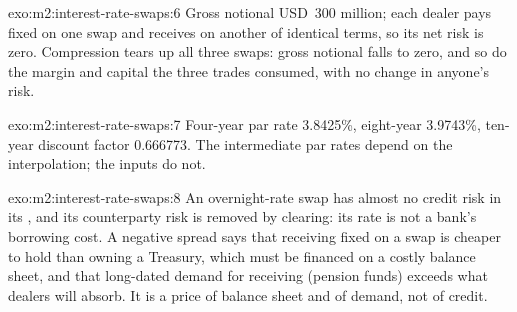 \begin{solution}{exo:m2:interest-rate-swaps:6}
Gross notional USD~300 million; each dealer pays fixed on one swap and receives
on another of identical terms, so its net risk is zero. Compression tears up
all three swaps: gross notional falls to zero, and so do the margin and capital
the three trades consumed, with no change in anyone's risk.
\end{solution}

\begin{solution}{exo:m2:interest-rate-swaps:7}
Four-year par rate 3.8425\%, eight-year 3.9743\%, ten-year discount factor
0.666773. The intermediate par rates depend on the interpolation; the inputs do
not.
\end{solution}

\begin{solution}{exo:m2:interest-rate-swaps:8}
An overnight-rate swap has almost no credit risk in its , and its
counterparty risk is removed by clearing: its rate is not a bank's borrowing
cost. A negative spread says that receiving fixed on a swap is cheaper to hold
than owning a Treasury, which must be financed on a costly balance sheet, and
that long-dated demand for receiving (pension funds) exceeds what dealers will
absorb. It is a price of balance sheet and of demand, not of credit.
\end{solution}

